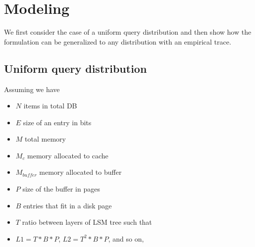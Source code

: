 \documentclass{sig-alternate-05-2015}
\begin{document}
\section{Modeling}

We first consider the case of a uniform query distribution and then show how the formulation can be generalized to any distribution with an empirical trace.

\subsection{Uniform query distribution}

\noindent Assuming we have
\begin{itemize}
\item $N$ items in total DB \\
\item $E$ size of an entry in bits \\
\item $M$ total memory \\
\item $M_c$ memory allocated to cache \\
\item $M_{buffer}$ memory allocated to buffer\\
\item $P$ size of the buffer in pages \\
\item $B$ entries that fit in a disk page \\
\item $T$ ratio between layers of LSM tree such that \\
  \item $L1 = T * B* P$, $L2 =T^2 * B*P $, and so on,
\end{itemize}
\end{document}
